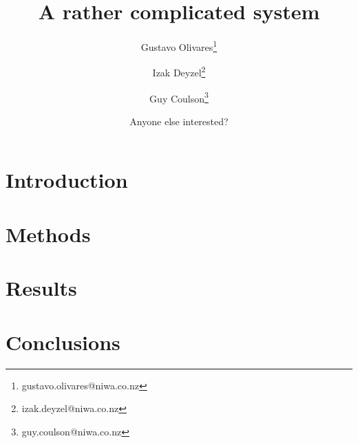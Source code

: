 \documentclass[a4paper,10pt]{article}
\title{A rather complicated system}
\author[1]{Gustavo Olivares\thanks{gustavo.olivares@niwa.co.nz}}
\author[1]{Izak Deyzel\thanks{izak.deyzel@niwa.co.nz}}
\author[1]{Guy Coulson\thanks{guy.coulson@niwa.co.nz}}
\author[1]{Anyone else interested?}
\affil[1]{National Institute of Water and Atmospheric research - NIWA}
\begin{document}
\maketitle

\begin{abstract}

\end{abstract}
\section*{Introduction}

\section*{Methods}

\section*{Results}

\section*{Conclusions}

\printbibliography
\end{document}

